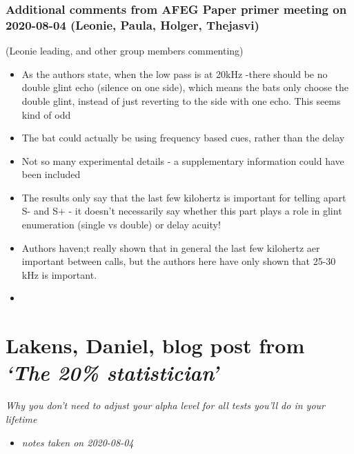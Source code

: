 \documentclass[
]{book}
\providecommand{\tightlist}{%
  \setlength{\itemsep}{0pt}\setlength{\parskip}{0pt}}
\begin{document}
\hypertarget{additional-comments-from-afeg-paper-primer-meeting-on-2020-08-04-leonie-paula-holger-thejasvi}{%
\subsection{Additional comments from AFEG Paper primer meeting on 2020-08-04 (Leonie, Paula, Holger, Thejasvi)}\label{additional-comments-from-afeg-paper-primer-meeting-on-2020-08-04-leonie-paula-holger-thejasvi}}

(Leonie leading, and other group members commenting)

\begin{itemize}
\item
  As the authors state, when the low pass is at 20kHz -there should be no
  double glint echo (silence on one side), which means the bats only choose the double glint,
  instead of just reverting to the side with one echo. This seems kind of odd
\item
  The bat could actually be using frequency based cues, rather than
  the delay
\item
  Not so many experimental details - a supplementary information could have been included
\item
  The results only say that the last few kilohertz is important for telling apart S- and S+ - it doesn't necessarily
  say whether this part plays a role in glint enumeration (single vs double) or delay acuity!
\item
  Authors haven;t really shown that in general the last few kilohertz aer important between calls, but the authors here have only shown that
  25-30 kHz is important.
\item
\end{itemize}

\hypertarget{lakens-daniel-blog-post-from-the-20-statistician}{%
\chapter{\texorpdfstring{Lakens, Daniel, blog post from \emph{`The 20\% statistician'}}{Lakens, Daniel, blog post from `The 20\% statistician'}}\label{lakens-daniel-blog-post-from-the-20-statistician}}


\emph{Why you don't need to adjust your alpha level for all tests you'll do in your lifetime} \citep{daniellakensa_2016}

\begin{itemize}
\tightlist
\item
  \emph{notes taken on 2020-08-04}
\end{itemize}
\end{document}
